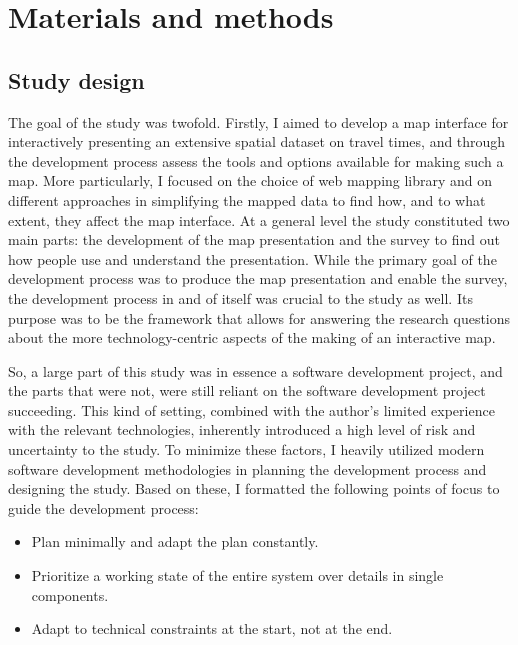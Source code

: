 \section{Materials and methods}

\subsection{Study design}

The goal of the study was twofold.
Firstly, I aimed to develop a map interface for
interactively presenting an extensive spatial dataset on travel times,
and through the development process assess
the tools and options available for making such a map.
More particularly,
I focused on the choice of web mapping library
and on different approaches in simplifying the mapped data to find how,
and to what extent,
they affect the map interface.
At a general level the study constituted two main parts:
the development of the map presentation and
the survey to find out how
people use and understand the presentation.
While the primary goal of the development process was
to produce the map presentation and enable the survey,
the development process in and of itself was crucial to the study as well.
Its purpose was to be the framework that
allows for answering the research questions
about the more technology-centric aspects of
the making of an interactive map.

So, a large part of this study was
in essence a software development project,
and the parts that were not, were still reliant on
the software development project succeeding.
This kind of setting,
combined with the author's limited experience with the relevant technologies,
inherently introduced a high level of risk and uncertainty to the study.
To minimize these factors,
I heavily utilized modern software development methodologies
\parencite{saq2020, bec2001, sha2017, kuh2017} in planning the development process
and designing the study.
Based on these,
I formatted the following points of focus
to guide the development process:
\begin{itemize}
	\item Plan minimally and adapt the plan constantly.
	\item Prioritize a working state of the entire system over details in single components.
	\item Adapt to technical constraints at the start, not at the end.
\end{itemize}

